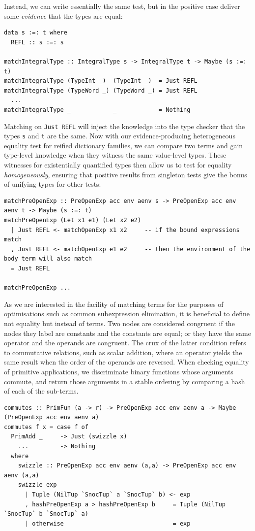 Instead, we can write essentially the same test, but in the positive case
deliver some \emph{evidence} that the types are equal:
%
\begin{lstlisting}[style=haskell]
data s :=: t where
  REFL :: s :=: s

matchIntegralType :: IntegralType s -> IntegralType t -> Maybe (s :=: t)
matchIntegralType (TypeInt _)  (TypeInt _)  = Just REFL
matchIntegralType (TypeWord _) (TypeWord _) = Just REFL
  ...
matchIntegralType _            _            = Nothing
\end{lstlisting}
%
Matching on \lstinline{Just REFL} will inject the knowledge into the type
checker that the types \texttt{s} and \texttt{t} are the same. Now with our
evidence-producing heterogeneous equality test for reified dictionary families,
we can compare two terms and gain type-level knowledge when they witness the
same value-level types. These witnesses for existentially quantified types then
allow us to test for equality \emph{homogeneously}, ensuring that positive
results from singleton tests give the bonus of unifying types for other tests:
%
\begin{lstlisting}[style=haskell]
matchPreOpenExp :: PreOpenExp acc env aenv s -> PreOpenExp acc env aenv t -> Maybe (s :=: t)
matchPreOpenExp (Let x1 e1) (Let x2 e2)
  | Just REFL <- matchOpenExp x1 x2     -- if the bound expressions match
  , Just REFL <- matchOpenExp e1 e2     -- then the environment of the body term will also match
  = Just REFL

matchPreOpenExp ...
\end{lstlisting}


As we are interested in the facility of matching terms for the purposes of
optimisations such as common subexpression elimination, it is beneficial to
define not equality but instead  of terms. Two nodes are
considered congruent if the nodes they label are constants and the constants are
equal; or they have the same operator and the operands are congruent. The crux
of the latter condition refers to commutative relations, such as scalar
addition, where an operator yields the same result when the order of the
operands are reversed. When checking equality of primitive applications, we
discriminate binary functions whose arguments commute, and return those
arguments in a stable ordering by comparing a hash of each of the
sub-terms.
%
\begin{lstlisting}[style=haskell]
commutes :: PrimFun (a -> r) -> PreOpenExp acc env aenv a -> Maybe (PreOpenExp acc env aenv a)
commutes f x = case f of
  PrimAdd _     -> Just (swizzle x)
    ...         -> Nothing
  where
    swizzle :: PreOpenExp acc env aenv (a,a) -> PreOpenExp acc env aenv (a,a)
    swizzle exp
      | Tuple (NilTup `SnocTup` a `SnocTup` b) <- exp
      , hashPreOpenExp a > hashPreOpenExp b     = Tuple (NilTup `SnocTup` b `SnocTup` a)
      | otherwise                               = exp
\end{lstlisting}


